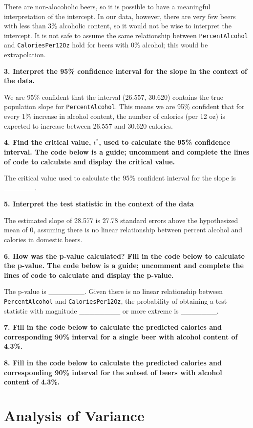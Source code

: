 \documentclass[]{book}
\begin{document}
There are non-alocoholic beers, so it is possible to have a meaningful
interpretation of the intercept. In our data, however, there are very
few beers with less than 3\% alcoholic content, so it would not be wise
to interpret the intercept. It is not safe to assume the same
relationship between \texttt{PercentAlcohol} and
\texttt{CaloriesPer12Oz} hold for beers with 0\% alcohol; this would be
extrapolation.

\textbf{3. Interpret the 95\% confidence interval for the slope in the
context of the data.}

We are 95\% confident that the interval (26.557, 30.620) contains the
true population slope for \texttt{PercentAlcohol}. This means we are
95\% confident that for every 1\% increase in alcohol content, the
number of calories (per 12 oz) is expected to increase between 26.557
and 30.620 calories.

\textbf{4. Find the critical value, \(t^*\), used to calculate the 95\%
confidence interval. The code below is a guide; uncomment and complete
the lines of code to calculate and display the critical value.}

The critical value used to calculate the 95\% confident interval for the
slope is \_\_\_\_\_\_.

\textbf{5. Interpret the test statistic in the context of the data}

The estimated slope of 28.577 is 27.78 standard errors above the
hypothesized mean of 0, assuming there is no linear relationship between
percent alcohol and calories in domestic beers.

\textbf{6. How was the p-value calculated? Fill in the code below to
calculate the p-value. The code below is a guide; uncomment and complete
the lines of code to calculate and display the p-value.}

The p-value is \_\_\_\_\_\_\_. Given there is no linear relationship
between \texttt{PercentAlcohol} and \texttt{CaloriesPer12Oz}, the
probability of obtaining a test statistic with magnitude
\_\_\_\_\_\_\_\_ or more extreme is \_\_\_\_\_\_\_.

\textbf{7. Fill in the code below to calculate the predicted calories
and corresponding 90\% interval for a single beer with alcohol content
of 4.3\%.}

\textbf{8. Fill in the code below to calculate the predicted calories
and corresponding 90\% interval for the subset of beers with alcohol
content of 4.3\%.}

\chapter{Analysis of Variance}\label{anova}
\end{document}

